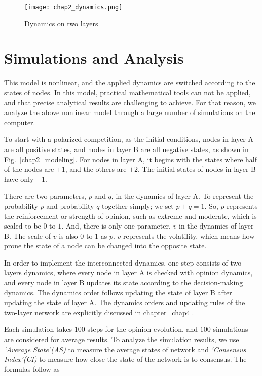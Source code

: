 \begin{figure}[!htb]
	\centering
	\texttt{[image: chap2\_dynamics.png]}
	\caption{Dynamics on two layers}
	\label{chap2_dynamics}
\end{figure}

\section{Simulations and Analysis}
This model is nonlinear, and the applied dynamics are switched according to the states of nodes. In this model, practical mathematical tools can not be applied, and that precise analytical results are challenging to achieve.\parencite{nicolas2017, rainer2002} For that reason, we analyze the above nonlinear model through a large number of simulations on the computer.

To start with a polarized competition, as the initial conditions,  nodes in layer A are all positive states, and nodes in layer B are all negative states, as shown in Fig.~\ref{chap2_modeling}. For nodes in layer A, it begins with the states where half of the nodes are $+1$, and the others are $+2$. The initial states of nodes in layer B have only $-1$.

There are two parameters, $p$ and $q$, in the dynamics of layer A. To represent the probability $p$ and probability $q$ together simply; we set $p+q=1$. So, $p$ represents the reinforcement or strength of opinion, such as extreme and moderate, which is scaled to be $0$ to $1$. And, there is only one parameter, $v$ in the dynamics of layer B. The scale of $v$ is also $0$ to $1$ as $p$. $v$ represents the volatility, which means how prone the state of a node can be changed into the opposite state.

In order to implement the interconnected dynamics, one step consists of two layers dynamics, where every node in layer A is checked with opinion dynamics, and every node in layer B updates its state according to the decision-making dynamics. The dynamics order follows updating the state of layer B after updating the state of layer A. The dynamics orders and updating rules of the two-layer network are explicitly discussed in chapter~\ref{chap4}.     

Each simulation takes $100$ steps for the opinion evolution, and $100$ simulations are considered for average results. To analyze the simulation results, we use \textit{`Average State'(AS)} to measure the average states of network and \textit{`Consensus Index'(CI)} to measure how close the state of the network is to consensus. The formulas follow as

